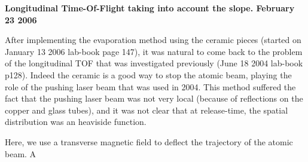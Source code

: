 \documentclass[a4,english,11pt]{article}
\begin{document}
\begin{center}
\begin{huge}
\textbf{Longitudinal Time-Of-Flight taking into account the slope.
February 23 2006}
\end{huge}
\end{center}

After implementing the evaporation method using the ceramic pieces
(started on January 13 2006 lab-book page 147), it was natural to
come back to the problem of the longitudinal TOF that was
investigated previously (June 18 2004 lab-book p128). Indeed the
ceramic is a good way to stop the atomic beam, playing the role of
the pushing laser beam that was used in 2004. This method suffered
the fact that the pushing laser beam was not very local (because
of reflections on the copper and glass tubes), and it was not
clear that at release-time, the spatial distribution was an
heaviside function.

Here, we use a transverse magnetic field to deflect the trajectory
of the atomic beam. A
\end{document}

